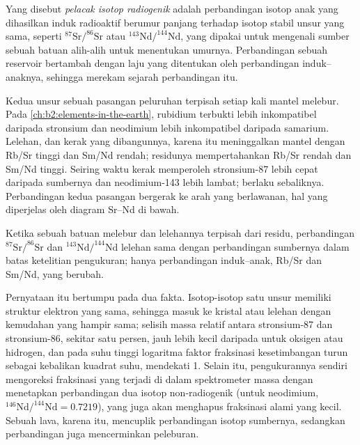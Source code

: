 \begin{definition}\label{def:b2:isotope-geochemistry:tracer}
Yang disebut \emph{pelacak isotop radiogenik} adalah perbandingan
isotop anak yang dihasilkan induk radioaktif berumur panjang terhadap isotop stabil
unsur yang sama, seperti $^{87}\mathrm{Sr}/^{86}\mathrm{Sr}$ atau
$^{143}\mathrm{Nd}/^{144}\mathrm{Nd}$, yang dipakai untuk mengenali sumber sebuah batuan alih-alih
untuk menentukan umurnya. Perbandingan sebuah reservoir bertambah dengan laju yang ditentukan oleh
perbandingan induk--anaknya, sehingga merekam sejarah perbandingan itu.
\end{definition}

Kedua unsur sebuah pasangan peluruhan terpisah setiap kali mantel melebur. Pada
\cref{ch:b2:elements-in-the-earth}, rubidium terbukti lebih inkompatibel daripada
stronsium dan neodimium lebih inkompatibel daripada samarium. Lelehan, dan kerak
yang dibangunnya, karena itu meninggalkan mantel dengan Rb/Sr tinggi dan Sm/Nd rendah;
residunya mempertahankan Rb/Sr rendah dan Sm/Nd tinggi. Seiring waktu kerak memperoleh
stronsium-87 lebih cepat daripada sumbernya dan neodimium-143 lebih lambat;  berlaku sebaliknya. Perbandingan kedua pasangan bergerak ke arah
yang berlawanan, hal yang diperjelas oleh diagram Sr--Nd di bawah.

\begin{proposition}\label{prop:b2:isotope-geochemistry:melting}
Ketika sebuah batuan melebur dan lelehannya terpisah dari residu, perbandingan
$^{87}\mathrm{Sr}/^{86}\mathrm{Sr}$ dan $^{143}\mathrm{Nd}/^{144}\mathrm{Nd}$
lelehan sama dengan perbandingan sumbernya dalam batas ketelitian
pengukuran; hanya perbandingan induk--anak, Rb/Sr dan Sm/Nd, yang berubah.
\end{proposition}
\admitted

\noindent Pernyataan itu bertumpu pada dua fakta. Isotop-isotop satu unsur memiliki
struktur elektron yang sama, sehingga masuk ke kristal atau lelehan dengan kemudahan yang hampir sama;
selisih massa relatif antara stronsium-87 dan stronsium-86, sekitar satu
persen, jauh lebih kecil daripada untuk oksigen atau hidrogen, dan pada suhu tinggi
logaritma faktor fraksinasi kesetimbangan turun sebagai kebalikan kuadrat
suhu, mendekati 1. Selain itu, pengukurannya sendiri mengoreksi
fraksinasi yang terjadi di dalam spektrometer massa dengan menetapkan perbandingan dua
isotop non-radiogenik (untuk neodimium, $^{146}\mathrm{Nd}/^{144}\mathrm{Nd} =
0.7219$), yang juga akan menghapus fraksinasi alami yang kecil. Sebuah lava,
karena itu, mencuplik perbandingan isotop sumbernya, sedangkan perbandingan
 juga mencerminkan peleburan.

